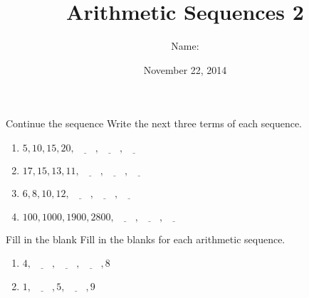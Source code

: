 \documentclass[12pt,letterpaper]{article}
\title{Arithmetic Sequences 2}
\author{Name: \underline{\hspace{5cm}}}
\date{November 22, 2014}
\begin{document}
\maketitle

\thispagestyle{empty}

\begin{problem}{Continue the sequence}
 Write the next three terms of each sequence.

\begin{enumerate}[\hspace{.5cm}a.]
\item $5, 10, 15, 20, \underline{\hspace{2em}}, \underline{\hspace{2em}},
\underline{\hspace{2em}}$
\item $17, 15, 13, 11, \underline{\hspace{2em}},
\underline{\hspace{2em}}, \underline{\hspace{2em}}$
\item $6, 8, 10, 12,
\underline{\hspace{2em}}, \underline{\hspace{2em}}, \underline{\hspace{2em}}$
\item $100, 1000, 1900, 2800, \underline{\hspace{2em}},
\underline{\hspace{2em}}, \underline{\hspace{2em}}$ \end{enumerate}
\end{problem}

\begin{problem}{Fill in the blank}
 Fill in the blanks for each arithmetic sequence.

\begin{enumerate}[\hspace{.5cm}a.]
\item $4, \underline{\hspace{2em}}, \underline{\hspace{2em}},
\underline{\hspace{2em}}, 8$
\item $1, \underline{\hspace{2em}}, 5, \underline{\hspace{2em}}, 9$
\end{enumerate}
\end{problem}
\end{document}
